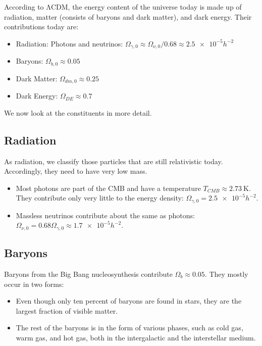 According to ΛCDM, the energy content of the universe today is made up of radiation, matter (consists of baryons and dark matter), and dark energy. Their contributions today are:
\begin{itemize}
	\item Radiation: Photons and neutrinos: $\Omega_{\gamma,0} \approx \Omega_{\nu,0}/0.68 \approx \num{2.5e-5} h^{-2}$
	\item Baryons:  $\Omega_{b,0} \approx 0.05$
	\item Dark Matter: $\Omega_{dm,0} \approx 0.25$
	\item Dark Energy: $\Omega_{DE} \approx 0.7$
\end{itemize}
We now look at the constituents in more detail.

\subsection*{Radiation}

As radiation, we classify those particles that are still relativistic today. Accordingly, they need to have very low mass.
\begin{itemize}
	\item Most photons are part of the CMB and have a temperature $T_{CMB} \approx \SI{2.73}{\kelvin}$. They contribute only very little to the energy density: $\Omega_{\gamma,0} = \num{2.5e-5} h^{-2}$.
	\item Massless neutrinos contribute about the same as photons: $\Omega_{\nu,0} = 0.68 \Omega_{\gamma,0} \approx \num{1.7e-5} h^{-2}$.
\end{itemize}

\subsection*{Baryons}
Baryons from the Big Bang nucleosynthesis contribute $\Omega_b \approx 0.05$. They mostly occur in two forms:
\begin{itemize}
	\item Even though only ten percent of baryons are found in stars, they are the largest fraction of visible matter.
	\item The rest of the baryons is in the form of various phases, such as cold gas, warm gas, and hot gas, both in the intergalactic and the interstellar medium.
\end{itemize}

